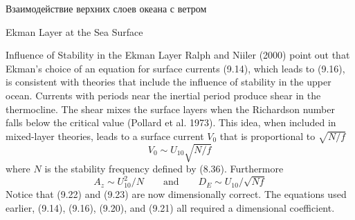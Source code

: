 \begin{chapter}{Взаимодействие верхних слоев океана с ветром}
\begin{section}{Ekman Layer at the Sea Surface}
\begin{paragraph}{Influence of Stability in the Ekman Layer}
Ralph and Niiler (2000)
point out that Ekman's choice of an equation for surface currents
(9.14), which leads to (9.16), is consistent with theories that
include the influence of stability in the upper ocean.  Currents with
periods near the inertial period produce shear
in the thermocline. The shear
mixes the surface layers when the Richardson number falls below the
critical value (Pollard et al. 1973). This idea, when included in
mixed-layer theories, leads to a surface current $V_0$ that is
proportional to $\sqrt{N/f}$
\begin{equation}
 V_0 \sim U_{10}  \sqrt{N/f}
\end{equation}
where $N$ is the stability frequency defined by (8.36). Furthermore
\begin{equation}
 A_z \sim U_{10}^2 / N \qquad \text{and} \qquad D_E \sim U_{10} / \sqrt{Nf}
\end{equation}
Notice that (9.22) and (9.23) are now dimensionally correct. The
equations used earlier, (9.14), (9.16), (9.20), and (9.21) all
required a dimensional coefficient.
%
\end{paragraph}
\end{section}


\end{chapter}
